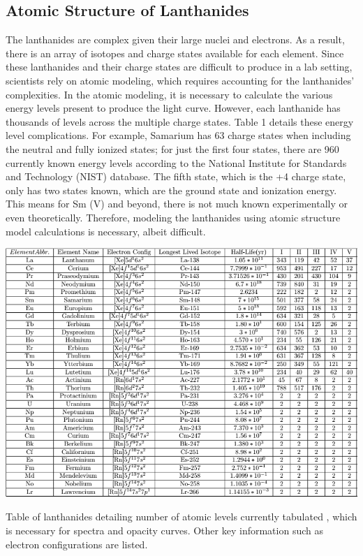 \documentclass[11pt,a4paper]{article}
\begin{document}
\subsection{Atomic Structure of Lanthanides}

The lanthanides are complex given their large nuclei and electrons. As a result, there is an array of isotopes and charge states available for each element. Since these lanthanides and their charge states are difficult to produce in a lab setting, scientists rely on atomic modeling, which requires accounting for the lanthanides' complexities. In the atomic modeling, it is necessary to calculate the various energy levels present to produce the light curve. However, each lanthanide has thousands of levels across the multiple charge states. Table 1 details these energy level complications. For example, Samarium has 63 charge states when including the neutral and fully ionized states; for just the first four states, there are 960 currently known energy levels according to the National Institute for Standards and Technology (NIST) database. The fifth state, which is the +4 charge state, only has two states known, which are the ground state and ionization energy. This means for Sm (V) and beyond, there is not much known experimentally or even theoretically. Therefore, modeling the lanthanides using atomic structure model calculations is necessary, albeit difficult. 


\begin{table}[h!]
  \includegraphics[width=1\textwidth]{level_pic.png}
  \caption{Table of lanthanides detailing number of atomic levels currently tabulated \cite{Kramida_2020}, which is necessary for spectra and opacity curves. Other key information such as electron configurations are listed.}
\end{table}
\end{document}

